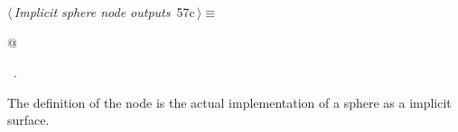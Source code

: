 \documentclass[
    a4paper,      %
    10pt,         %
    openright,    %
    notitlepage,  %
    parskip=half, %
]{scrreprt}       %
\theoremstyle{definition}                    %
\begin{document}
\begin{flushleft} \small
\begin{minipage}{\linewidth}\label{scrap92}\raggedright\small
{} $\langle\,${\itshape Implicit sphere node outputs}\nobreak\ {\footnotesize {57c}}$\,\rangle\equiv$
\vspace{-1exm}
\begin{list}{}{} \item
\mbox{}@{\NWsep}
\end{list}
\vspace{-1.5ex}
\footnotesize
\begin{list}{}{\setlength{\itemsep}{-\parsep}\setlength{\itemindent}{-\leftmargin}}
\item \NWtxtMacroRefIn\ .

\item{}
\end{list}
\end{minipage}\vspace{4ex}
\end{flushleft}
The definition of the node is the actual implementation of a sphere as a
implicit surface.
\end{document}
